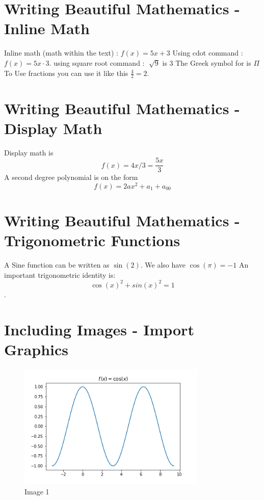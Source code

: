 \documentclass{report}
\theoremstyle{plain} %
\begin{document}
\section{Writing Beautiful Mathematics - Inline Math}

Inline math (math within the text) : $f(x) = 5x +3$ %
\newline Using cdot command : $ f(x) = 5x \cdot 3$.
\newline using square root command : $\sqrt[]{9}$  is $3$ %
\newline The Greek symbol for  is  $\Pi$
\newline To Use fractions you can use it like this $ \frac{4} {2} = 2 $.


\section {Writing Beautiful Mathematics - Display Math } 
Display math is \[f(x) = 4x /3 = \frac{5x}{3}\] 
\newline A second degree polynomial is on the form \[f(x) = {2}a x^{2} + a_{1} + a_{00}\]

\section {Writing Beautiful Mathematics -Trigonometric Functions } 

 A Sine function can be written as $\sin(2)$.
 \newline We also have $\cos(\pi) = -1$
 \newline An important trigonometric identity is: 
 \[\cos(x) ^{2} + sin(x) ^2 = 1\].


 \section{Including Images - Import Graphics}

\begin{figure}[ht]
    \centering
    \includegraphics[width=0.8\textwidth]{images/example_graph.png}
    \caption{Image 1}
    \label{fig:1}
\end{figure}
\end{document}
